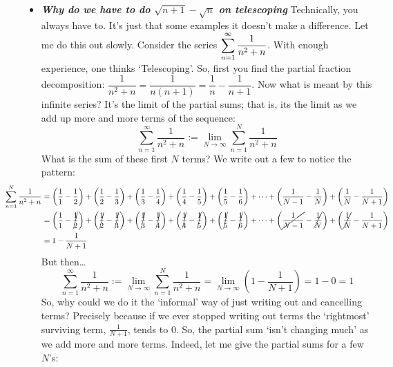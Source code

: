 \documentclass[11pt,letterpaper]{article}
\begin{document}
\begin{itemize}
\item {\bfseries\itshape Why do we have to do $\sqrt{n + 1} - \sqrt{n}$ on telescoping} Technically, you always have to. It's just that some examples it doesn't make a difference. Let me do this out slowly. Consider the series $\displaystyle\sum_{n=1}^\infty \dfrac{1}{n^2 + n}$. With enough experience, one thinks `Telescoping'. So, first you find the partial fraction decomposition: $\dfrac{1}{n^2 + n}= \dfrac{1}{n(n + 1)}= \dfrac{1}{n} - \dfrac{1}{n + 1}$. Now what is meant by this infinite series? It's the limit of the partial sums; that is, its the limit as we add up more and more terms of the sequence:
	\[
	\sum_{n=1}^\infty \dfrac{1}{n^2 + n}:= \lim_{N \to \infty} \sum_{n=1}^N \dfrac{1}{n^2 + n}
	\]
What is the sum of these first $N$ terms? We write out a few to notice the pattern:
	\[
	\begin{aligned}
	\hspace{-2cm} \sum_{n=1}^N \dfrac{1}{n^2 + n}&= \left( \dfrac{1}{1} - \dfrac{1}{2} \right) + \left( \dfrac{1}{2} - \dfrac{1}{3} \right) + \left( \dfrac{1}{3} - \dfrac{1}{4} \right) + \left( \dfrac{1}{4} - \dfrac{1}{5} \right) + \left( \dfrac{1}{5} - \dfrac{1}{6} \right) +  \cdots + \left( \dfrac{1}{N - 1} - \dfrac{1}{N} \right) + \left( \dfrac{1}{N} - \dfrac{1}{N+1} \right) \\
	&= \left( \dfrac{1}{1} - \cancel{\dfrac{1}{2}} \right) + \left( \cancel{\dfrac{1}{2}} - \cancel{\dfrac{1}{3}} \right) + \left( \cancel{\dfrac{1}{3}} - \cancel{\dfrac{1}{4}} \right) + \left( \cancel{\dfrac{1}{4}} - \cancel{\dfrac{1}{5}} \right) + \left( \cancel{\dfrac{1}{5}} - \cancel{\dfrac{1}{6}} \right) +  \cdots + \left( \cancel{\dfrac{1}{N - 1}} - \cancel{\dfrac{1}{N}} \right) + \left( \cancel{\dfrac{1}{N}} - \dfrac{1}{N+1} \right) \\
	&= 1 - \dfrac{1}{N + 1}
	\end{aligned}
	\]
But then\dots
	\[
	\sum_{n=1}^\infty \dfrac{1}{n^2 + n}:= \lim_{N \to \infty} \sum_{n=1}^N \dfrac{1}{n^2 + n}= \lim_{N \to \infty} \left( 1 - \dfrac{1}{N+1} \right)= 1 - 0= 1
	\]
So, why could we do it the `informal' way of just writing out and cancelling terms? Precisely because if we ever stopped writing out terms the `rightmost' surviving term, $\frac{1}{N + 1}$, tends to 0. So, the partial sum `isn't changing much' as we add more and more terms. Indeed, let me give the partial sums for a few $N$'s:
	\begin{table}[H]
	\hspace{-1.5cm}
	\begin{tabular}{r||ccccccc}

\end{tabular}
\end{table}
\end{itemize}
\end{document}
